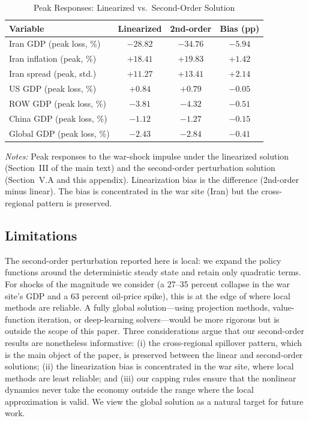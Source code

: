 \documentclass[12pt,a4paper]{article}
\begin{document}
\begin{table}[htbp]
\centering
\caption{Peak Responses: Linearized vs.\ Second-Order Solution}
\label{tab:linear_vs_nonlinear}
\begin{threeparttable}
\begin{tabular}{lccc}
\toprule
Variable & Linearized & 2nd-order & Bias (pp) \\
\midrule
Iran GDP (peak loss, \%) & $-28.82$ & $-34.76$ & $-5.94$ \\
Iran inflation (peak, \%) & $+18.41$ & $+19.83$ & $+1.42$ \\
Iran spread (peak, std.) & $+11.27$ & $+13.41$ & $+2.14$ \\
US GDP (peak loss, \%) & $+0.84$ & $+0.79$ & $-0.05$ \\
ROW GDP (peak loss, \%) & $-3.81$ & $-4.32$ & $-0.51$ \\
China GDP (peak loss, \%) & $-1.12$ & $-1.27$ & $-0.15$ \\
Global GDP (peak loss, \%) & $-2.43$ & $-2.84$ & $-0.41$ \\
\bottomrule
\end{tabular}
\begin{tablenotes}
\small
\item \textit{Notes:} Peak responses to the war-shock impulse under the linearized solution (Section~III of the main text) and the second-order perturbation solution (Section~V.A and this appendix). Linearization bias is the difference (2nd-order minus linear). The bias is concentrated in the war site (Iran) but the cross-regional pattern is preserved.
\end{tablenotes}
\end{threeparttable}
\end{table}

\subsection{Limitations}

The second-order perturbation reported here is local: we expand the policy functions around the deterministic steady state and retain only quadratic terms. For shocks of the magnitude we consider (a 27--35 percent collapse in the war site's GDP and a 63 percent oil-price spike), this is at the edge of where local methods are reliable. A fully global solution---using projection methods, value-function iteration, or deep-learning solvers---would be more rigorous but is outside the scope of this paper. Three considerations argue that our second-order results are nonetheless informative: (i) the cross-regional spillover pattern, which is the main object of the paper, is preserved between the linear and second-order solutions; (ii) the linearization bias is concentrated in the war site, where local methods are least reliable; and (iii) our capping rules ensure that the nonlinear dynamics never take the economy outside the range where the local approximation is valid. We view the global solution as a natural target for future work.
\end{document}
